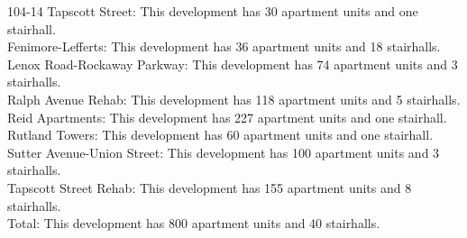 {104-14 Tapscott Street}: This development has 30 apartment units and one stairhall.\\{Fenimore-Lefferts}: This development has 36 apartment units and 18 stairhalls.\\{Lenox Road-Rockaway Parkway}: This development has 74 apartment units and 3 stairhalls.\\{Ralph Avenue Rehab}: This development has 118 apartment units and 5 stairhalls.\\{Reid Apartments}: This development has 227 apartment units and one stairhall.\\{Rutland Towers}: This development has 60 apartment units and one stairhall.\\{Sutter Avenue-Union Street}: This development has 100 apartment units and 3 stairhalls.\\{Tapscott Street Rehab}: This development has 155 apartment units and 8 stairhalls.\\{Total}: This development has 800 apartment units and 40 stairhalls.\\
